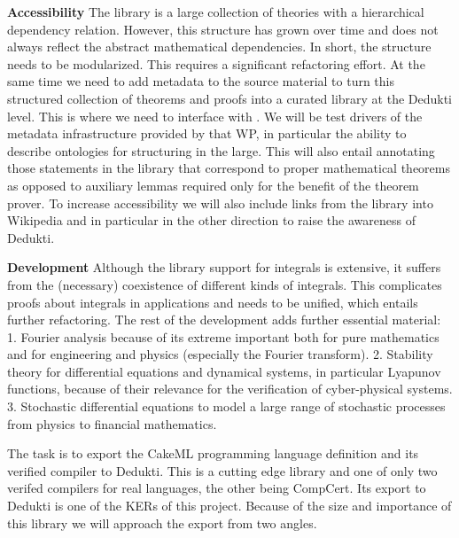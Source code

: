 \begin{workpackage}[id=libraries,wphases=0-48,type=RTD,
  short=Libraries,%
  title=Libraries,
  lead=Inr,
  InrRM=10,
  TumRM=24]
\begin{tasklist}
\begin{task}[id=isaAnalysisProb,title=The Isabelle Analysis \& Probability library]
\textbf{Accessibility}\quad
The library is a large collection of theories with a hierarchical dependency
relation. However, this structure has grown over time and does not always
reflect the abstract mathematical dependencies. In short, the structure needs
to be modularized. This requires a significant refactoring effort.
%
At the same time we need to add metadata to the source material to turn this
structured collection of theorems and proofs into a curated library at the
Dedukti level.  This is where we need to interface with . We
will be test drivers of the metadata infrastructure provided by that WP, in
particular the ability to describe ontologies for structuring in the large.
This will also entail annotating those statements in the library that
correspond to proper mathematical theorems as opposed to auxiliary lemmas
required only for the benefit of the theorem prover.
To increase accessibility we will also include links from the library into
Wikipedia and in particular in the other direction to raise the awareness
of Dedukti.

\textbf{Development}\quad
Although the library support for integrals is extensive, it suffers
from the (necessary) coexistence of different kinds of
integrals. This complicates proofs about integrals in applications and needs
to be unified, which entails further refactoring. The rest of the
development adds further essential material:
1. Fourier analysis because of its extreme important both for pure mathematics and for
engineering and physics (especially the Fourier
transform). 2. Stability theory for differential equations and
dynamical systems, in particular Lyapunov functions, because of their
relevance for the verification of cyber-physical systems.
3. Stochastic differential equations to model a large range of
stochastic processes from physics to financial mathematics.
\end{task}

\begin{task}[id=geocoq,title=The GeoCoq library]
\end{task}

\begin{task}[id=flyspeck,title=The Flyspeck library]
\end{task}

\begin{task}[id=cakeml,title=The CakeML programming language library]
The task is to export the CakeML programming language definition and
its verified compiler to Dedukti. This is a cutting edge library and
one of only two verifed compilers for real languages, the other being
CompCert. Its export to Dedukti is one of the KERs of this
project. Because of the size and importance of this library we will approach the
export from two angles.


\end{task}
\end{tasklist}
\end{workpackage}
